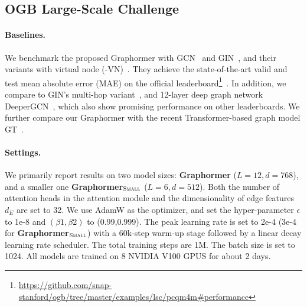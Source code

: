 \documentclass{article}
\begin{document}
\subsection{OGB Large-Scale Challenge}
\paragraph{Baselines.} We benchmark the proposed Graphormer with GCN~\cite{kipf2016semi} and GIN~\cite{xu2018how}, and their variants with virtual node (-VN)~\cite{gilmer2017neural}. They achieve the state-of-the-art valid and test mean absolute error (MAE) on the official leaderboard\footnote{\url{https://github.com/snap-stanford/ogb/tree/master/examples/lsc/pcqm4m\#performance}}~\cite{hu2021ogb}. In addition, we compare to GIN's multi-hop variant~\cite{brossard2020graph}, and 12-layer deep graph network DeeperGCN~\cite{li2020deepergcn}, which also show promising performance on other leaderboards. We further compare our Graphormer with the recent Transformer-based graph model GT~\cite{dwivedi2021generalization}.

\paragraph{Settings.} We primarily report results on two model sizes: \textbf{Graphormer} ($L=12, d=768$), and a smaller one \textbf{Graphormer$_{\small \textsc{Small}}$\xspace} ($L=6, d=512$). Both the number of attention heads in the attention module and the dimensionality of edge features $d_E$ are set to 32. We use AdamW as the optimizer, and set the hyper-parameter $\epsilon$ to 1e-8 and $(\beta1,\beta2)$ to (0.99,0.999). The peak learning rate is set to 2e-4 (3e-4 for \textbf{Graphormer$_{\small \textsc{Small}}$\xspace}) with a 60k-step warm-up stage followed by a linear decay learning rate scheduler. The total training steps are 1M. The batch size is set to 1024. All models are trained on 8 NVIDIA V100 GPUS for about 2 days.
\end{document}
